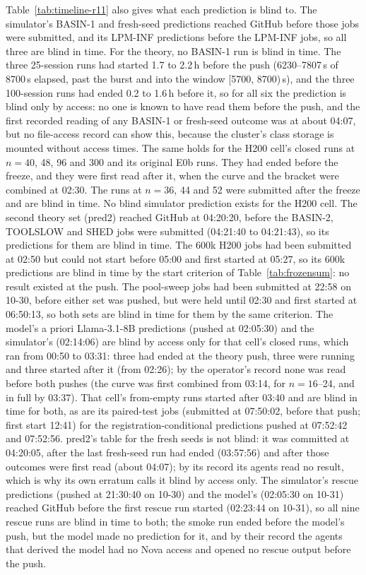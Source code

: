 Table~\ref{tab:timeline-r11} also gives what each prediction is blind to. The simulator's BASIN-1 and fresh-seed predictions reached GitHub before those jobs were submitted, and its LPM-INF predictions before the LPM-INF jobs, so all three are blind in time. For the theory, no BASIN-1 run is blind in time. The three 25-session runs had started 1.7 to 2.2\,h before the push (6230--7807\,s of 8700\,s elapsed, past the burst and into the window [5700, 8700)\,s), and the three 100-session runs had ended 0.2 to 1.6\,h before it, so for all six the prediction is blind only by access: no one is known to have read them before the push, and the first recorded reading of any BASIN-1 or fresh-seed outcome was at about 04:07, but no file-access record can show this, because the cluster's class storage is mounted without access times. The same holds for the H200 cell's closed runs at $n=40$, 48, 96 and 300 and its original E0b runs. They had ended before the freeze, and they were first read after it, when the curve and the bracket were combined at 02:30. The runs at $n=36$, 44 and 52 were submitted after the freeze and are blind in time. No blind simulator prediction exists for the H200 cell. The second theory set (pred2) reached GitHub at 04:20:20, before the BASIN-2, TOOLSLOW and SHED jobs were submitted (04:21:40 to 04:21:43), so its predictions for them are blind in time. The 600k H200 jobs had been submitted at 02:50 but could not start before 05:00 and first started at 05:27, so its 600k predictions are blind in time by the start criterion of Table~\ref{tab:frozensum}: no result existed at the push. The pool-sweep jobs had been submitted at 22:58 on 10-30, before either set was pushed, but were held until 02:30 and first started at 06:50:13, so both sets are blind in time for them by the same criterion. The model's a priori Llama-3.1-8B predictions (pushed at 02:05:30) and the simulator's (02:14:06) are blind by access only for that cell's closed runs, which ran from 00:50 to 03:31: three had ended at the theory push, three were running and three started after it (from 02:26); by the operator's record none was read before both pushes (the curve was first combined from 03:14, for $n=16$--24, and in full by 03:37). That cell's from-empty runs started after 03:40 and are blind in time for both, as are its paired-test jobs (submitted at 07:50:02, before that push; first start 12:41) for the registration-conditional predictions pushed at 07:52:42 and 07:52:56. pred2's table for the fresh seeds is not blind: it was committed at 04:20:05, after the last fresh-seed run had ended (03:57:56) and after those outcomes were first read (about 04:07); by its record its agents read no result, which is why its own erratum calls it blind by access only. The simulator's rescue predictions (pushed at 21:30:40 on 10-30) and the model's (02:05:30 on 10-31) reached GitHub before the first rescue run started (02:23:44 on 10-31), so all nine rescue runs are blind in time to both; the smoke run ended before the model's push, but the model made no prediction for it, and by their record the agents that derived the model had no Nova access and opened no rescue output before the push.

